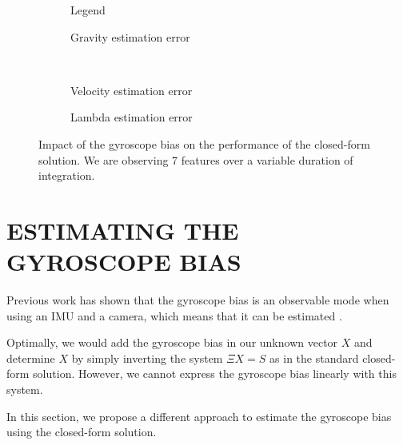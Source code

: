 \documentclass[letterpaper, 10 pt, conference]{ieeeconf}  %
\begin{document}
\begin{figure}
  \centering
        \hspace{0.2\columnwidth}%
        \begin{subfigure}[b]{0.3\columnwidth}
                \resizebox{\columnwidth}{!}{}
                \caption{Legend}

        \end{subfigure}%
        \begin{subfigure}[b]{0.5\columnwidth}
                \resizebox{\columnwidth}{!}{}
                \caption{Gravity estimation error}

        \end{subfigure}
        ~
        \begin{subfigure}[b]{0.5\columnwidth}
                \resizebox{\columnwidth}{!}{}
                \caption{Velocity estimation error}

        \end{subfigure}%
        \begin{subfigure}[b]{0.5\columnwidth}
                \resizebox{\columnwidth}{!}{}
                \caption{Lambda estimation error}

        \end{subfigure}
        \caption{Impact of the gyroscope bias on the performance of the closed-form solution. We are observing 7 features over a variable duration of integration. \label{fig:biasGyroCF}}
\end{figure}




\section{ESTIMATING THE GYROSCOPE BIAS}\label{SectionCalibration}

Previous work has shown that the gyroscope bias is an observable mode when using an IMU and a camera, which means that it can be estimated \cite{Martinelli2012}.

Optimally, we would add the gyroscope bias in our unknown vector $X$ and determine $X$ by simply inverting the system $\Xi X = S$ as in the standard closed-form solution.
However, we cannot express the gyroscope bias linearly with this system.

In this section, we propose a different approach to estimate the gyroscope bias using the closed-form solution.
\end{document}
